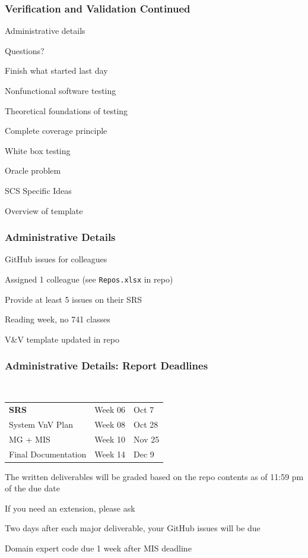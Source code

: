 \documentclass[t,12pt,numbers,fleqn]{beamer}
\begin{document}



\begin{frame}
\frametitle{Verification and Validation Continued}

\bi
\item Administrative details
\item Questions?
\item Finish what started last day
\bi
\item Nonfunctional software testing
\item Theoretical foundations of testing
\item Complete coverage principle
\ei
\item White box testing
\item Oracle problem
\item SCS Specific Ideas
\item Overview of template
\ei

\end{frame}


\begin{frame}
\frametitle{Administrative Details}

\bi
\item GitHub issues for colleagues
\bi
\item Assigned 1 colleague (see \texttt{Repos.xlsx} in repo)
\item Provide at least 5 issues on their SRS
\ei
\item Reading week, no 741 classes
\item V\&V template updated in repo
\ei

\end{frame}


\begin{frame}
\frametitle{Administrative Details: Report Deadlines}
~\newline
\begin{tabular}{l l l}
\textbf{SRS} & Week 06 & Oct 7\\
System VnV Plan & Week 08 & Oct 28\\
MG + MIS & Week 10 & Nov 25\\
Final Documentation & Week 14 & Dec 9\\
\end {tabular}

\bi
\item The written deliverables will be graded based on the repo contents as of
11:59 pm of the due date
\item If you need an extension, please ask
\item Two days after each major deliverable, your GitHub issues will be due
\item Domain expert code due 1 week after MIS deadline
\ei

\end{frame}
\end{document}
